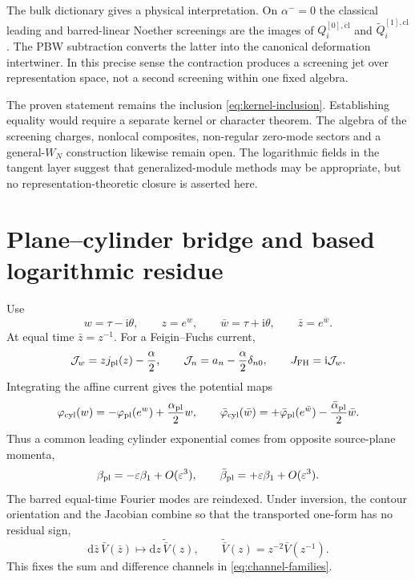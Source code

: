 \documentclass[11pt,a4paper]{article}
\numberwithin{equation}{section}
\theoremstyle{remark}
\newcommand{\cl}{\mathrm{cl}}
\newcommand{\ii}{\mathrm{i}}
\newcommand{\dd}{\mathrm{d}}
\newcommand{\eps}{\varepsilon}
\begin{document}
The bulk dictionary gives a physical interpretation.  On $\alpha^-=0$ the classical leading and
barred-linear Noether screenings are the images of $Q_i^{[0],\cl}$ and
$\widetilde Q_i^{[1],\cl}$.  The PBW subtraction converts the latter into the canonical
deformation intertwiner.  In this precise sense the contraction produces a screening jet over
representation space, not a second screening within one fixed algebra.

The proven statement remains the inclusion \cref{eq:kernel-inclusion}.  Establishing equality
would require a separate kernel or character theorem.  The algebra of the screening charges,
nonlocal composites, non-regular zero-mode sectors and a general-$W_N$ construction likewise
remain open.  The logarithmic fields in the tangent layer suggest that generalized-module
methods \cite{HuangLepowskyZhang,AdamovicRadoboljaW22,AdamovicRadoboljaTHV} may be
appropriate, but no representation-theoretic closure is asserted here.

\appendix

\section{Plane--cylinder bridge and based logarithmic residue}
\label{app:plane-cylinder}

Use
\begin{equation}
 w=\tau-\ii\theta,\qquad z=e^w,\qquad
 \bar w=\tau+\ii\theta,\qquad \bar z=e^{\bar w}.
 \label{eq:plane-cylinder-coordinates}
\end{equation}
At equal time $\bar z=z^{-1}$.  For a Feigin--Fuchs current,
\begin{equation}
 \mathcal J_w=zj_{\rm pl}(z)-\frac\alpha2,
 \qquad
 \mathcal J_n=a_n-\frac\alpha2\delta_{n0},
 \qquad
 J_{\rm FH}=\ii\mathcal J_w.
 \label{eq:affine-cylinder-current}
\end{equation}
Integrating the affine current gives the potential maps
\begin{equation}
 \varphi_{\rm cyl}(w)=-\varphi_{\rm pl}(e^w)+\frac{\alpha_{\rm pl}}2w,
 \qquad
 \bar\varphi_{\rm cyl}(\bar w)=+\bar\varphi_{\rm pl}(e^{\bar w})
 -\frac{\bar\alpha_{\rm pl}}2\bar w.
 \label{eq:potential-cylinder-map}
\end{equation}
Thus a common leading cylinder exponential comes from opposite source-plane momenta,
\begin{equation}
 \beta_{\rm pl}=-\eps\beta_1+O(\eps^3),
 \qquad
 \bar\beta_{\rm pl}=+\eps\beta_1+O(\eps^3).
 \label{eq:source-plane-momenta}
\end{equation}
The barred equal-time Fourier modes are reindexed.  Under inversion, the contour orientation
and the Jacobian combine so that the transported one-form has no residual sign,
\begin{equation}
 \dd\bar z\,\bar V(\bar z)\longmapsto
 \dd z\,\widetilde{\bar V}(z),
 \qquad
 \widetilde{\bar V}(z)=z^{-2}\bar V(z^{-1}).
 \label{eq:barred-one-form}
\end{equation}
This fixes the sum and difference channels in \cref{eq:channel-families}.
\end{document}
